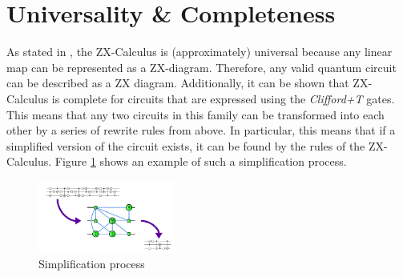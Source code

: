 \section{Universality \& Completeness}

As stated in \cite{duncan2020simplification}, the ZX-Calculus is (approximately) universal because any linear map can be represented as a ZX-diagram. Therefore, any valid quantum circuit can be described as a ZX diagram. Additionally, it can be shown that ZX-Calculus is complete for circuits that are expressed using the \textit{Clifford+T} gates. This means that any two circuits in this family can be transformed into each other by a series of rewrite rules from above.
In particular, this means that if a simplified version of the circuit exists, it can be found by the rules of the ZX-Calculus.
Figure \ref{fig:simplification-idea} shows an example of such a simplification process.

\begin{figure}[h!]
    \centering
    \includegraphics[width=0.4\textwidth]{images/simplification-idea.png}
    \caption{Simplification process\cite{duncan2020simplification-image}}
    \label{fig:simplification-idea}
\end{figure}